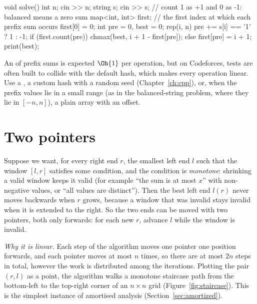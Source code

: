 \begin{code}
void solve() {
    int n;
    cin >> n;
    string s;
    cin >> s;
    // count 1 as +1 and 0 as -1: balanced means a zero sum
    map<int, int> first;  // the first index at which each prefix sum occurs
    first[0] = 0;
    int pre = 0, best = 0;
    rep(i, n) {
        pre += s[i] == '1' ? 1 : -1;
        if (first.count(pre)) chmax(best, i + 1 - first[pre]);
        else first[pre] = i + 1;
    }
    print(best);
}
\end{code}

\begin{pitfall}
An  of prefix sums is expected $\Oh{1}$ per operation, but on Codeforces, tests are often built to collide
with the default hash, which makes every operation linear. Use a , a custom hash with a random seed
(Chapter~\ref{ch:cpp}), or, when the prefix values lie in a small range (as in the balanced-string problem, where they lie in
$[-n, n]$), a plain array with an offset.
\end{pitfall}

\section[Two pointers]{Two pointers \hfill \silver}\label{sec:two-pointers}

Suppose we want, for every right end $r$, the smallest left end $l$ such that the window $[l, r]$ satisfies some condition,
and the condition is \emph{monotone}: shrinking a valid window keeps it valid (for example ``the sum is at most $x$'' with
non-negative values, or ``all values are distinct''). Then the best left end $l(r)$ never moves backwards when $r$ grows,
because a window that was invalid stays invalid when it is extended to the right. So the two ends can be moved with two
pointers, both only forwards: for each new $r$, advance $l$ while the window is invalid.

\emph{Why it is linear.} Each step of the algorithm moves one pointer one position forwards, and each pointer moves at most
$n$ times, so there are at most $2n$ steps in total, however the work is distributed among the iterations. Plotting the pair
$(r, l)$ as a point, the algorithm walks a monotone staircase path from the bottom-left to the top-right corner of an
$n \times n$ grid (Figure~\ref{fig:staircase}). This is the simplest instance of amortised analysis
(Section~\ref{sec:amortized}).

